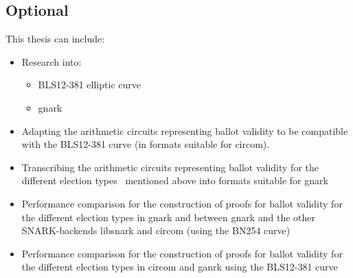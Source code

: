 \documentclass[12pt]{article}
\begin{document}
\subsection{Optional}
This thesis can include:
\begin{itemize}
    \item Research into:
    \begin{itemize}
        \item BLS12-381 elliptic curve
        \item gnark~\cite{gnark}
    \end{itemize}
    \item Adapting the arithmetic circuits representing ballot validity to be compatible with the BLS12-381 curve (in formats suitable for circom).
    \item Transcribing the arithmetic circuits representing ballot validity for the different election types~\cite{BallotSnarks} mentioned above into formats suitable for gnark
    \item Performance comparison for the construction of proofs for ballot validity for the different election types in gnark and between gnark and the other SNARK-backends libsnark and circom (using the BN254 curve)
    \item Performance comparison for the construction of proofs for ballot validity for the different election types in circom and ganrk using the BLS12-381 curve
\end{itemize}




% 
% 
% 
% 
% 
% 
% 
% 
\end{document}
